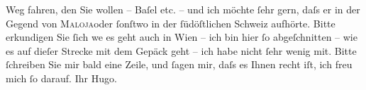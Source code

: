 \begin{ledgroupsized}[t]{13cm}
               Weg fahren, den Sie wollen – Baſel etc. – und ich
               möchte ſehr gern, daſs er in der Gegend von \textsc{Maloja}oder ſonſtwo in der ſüdöſtlichen
                  Schweiz aufhörte. Bitte erkundigen Sie ſich
                  we{\geminationn} es geht auch in Wien – ich bin hier ſo abgeſchnitten – wie es auf dieſer Strecke mit dem
               Gepäck geht – ich habe nicht ſehr wenig mit. Bitte ſchreiben Sie mir bald eine Zeile,
               und ſagen mir, daſs es Ihnen recht iſt, ich freu mich ſo darauf. Ihr
                  \spacefill\mbox{Hugo.}\pend
           
         
         \endnumbering{}\end{ledgroupsized}  \newcommand{\dateiname}{L00810}\newcommand{\titel}{Hugo von Hofmannsthal an Arthur Schnitzler, 2. 7. [1898]}\newcommand{\editorInnen}{Martin Anton Müller und Gerd-Hermann Susen}
      
